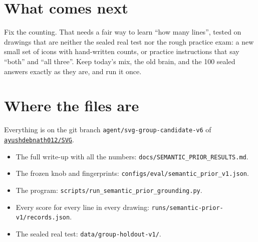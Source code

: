 \documentclass[11pt,a4paper]{article}
\begin{document}
\section*{What comes next}

Fix the counting. That needs a fair way to learn ``how many lines'', tested on drawings that are neither the sealed real test nor the rough practice exam: a new small set of icons with hand-written counts, or practice instructions that say ``both'' and ``all three''.
Keep today's mix, the old brain, and the 100 sealed answers exactly as they are, and run it once.

\section*{Where the files are}

Everything is on the git branch \texttt{agent/svg-group-candidate-v6} of \href{https://github.com/ayushdebnath012/SVG}{\texttt{ayushdebnath012/SVG}}.
\begin{itemize}[leftmargin=1.6em]
  \item The full write-up with all the numbers: \texttt{docs/SEMANTIC\_PRIOR\_RESULTS.md}.
  \item The frozen knob and fingerprints: \texttt{configs/eval/semantic\_prior\_v1.json}.
  \item The program: \texttt{scripts/run\_semantic\_prior\_grounding.py}.
  \item Every score for every line in every drawing: \texttt{runs/semantic-prior-v1/records.json}.
  \item The sealed real test: \texttt{data/group-holdout-v1/}.
\end{itemize}
\end{document}
